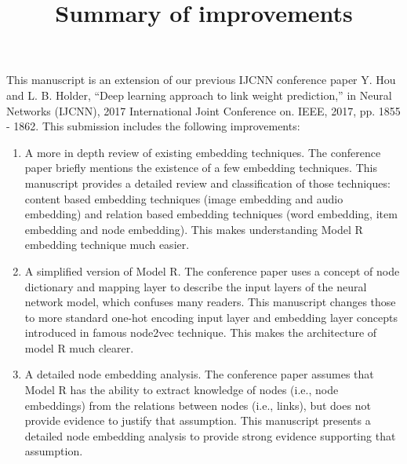 \documentclass{article}
\begin{document}
\title{Summary of improvements}
\maketitle

This manuscript is an extension of our previous IJCNN conference paper
Y. Hou and L. B. Holder, “Deep learning approach to link weight
prediction,” in Neural Networks (IJCNN), 2017 International Joint
Conference on. IEEE, 2017, pp. 1855 - 1862.
This submission includes the following improvements:
\begin{enumerate}
	\item A more in depth review of existing embedding techniques.
	The conference paper briefly mentions the existence of a few embedding techniques.
	This manuscript provides a detailed review and classification of those techniques: content based embedding techniques (image embedding and audio embedding) and relation based embedding techniques (word embedding, item embedding and node embedding).
	This makes understanding Model R embedding technique much easier.
	\item A simplified version of Model R.
	The conference paper uses a concept of node dictionary and mapping layer to describe the input layers of the neural network model, which confuses many readers.
	This manuscript changes those to more standard one-hot encoding input layer and embedding layer concepts introduced in famous node2vec technique.
	This makes the architecture of model R much clearer.
	\item A detailed node embedding analysis.
	The conference paper assumes that Model R has the ability to extract knowledge of nodes (i.e., node embeddings) from the relations between nodes (i.e., links), but does not provide evidence to justify that assumption.
	This manuscript presents a detailed node embedding analysis to provide strong evidence supporting that assumption.
\end{enumerate}
\end{document}
